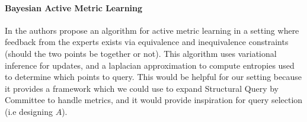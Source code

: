 \documentclass{article}
\begin{document}
\paragraph{Bayesian Active Metric Learning} 
In \cite{bayesian-metric} the authors propose an algorithm for active metric learning in a setting where feedback from the experts exists via equivalence and inequivalence constraints (should the two points be together or not).
This algorithm uses variational inference for updates, and a laplacian approximation to compute entropies used to determine which points to query. 
This would be helpful for our setting because it provides a framework which we could use to expand Structural Query by Committee to handle metrics, and it would provide inspiration for query selection (i.e designing  $A$).









\end{document}
